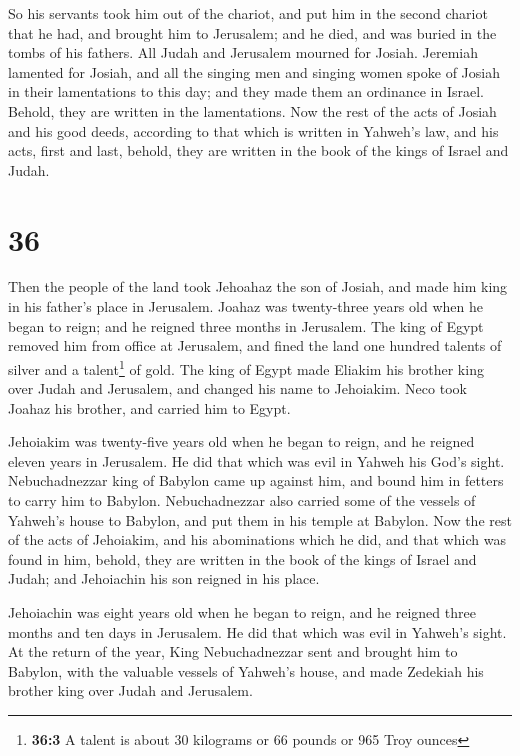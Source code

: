  So his servants took him out of the chariot, and put him
in the second chariot that he had, and brought him to Jerusalem; and he
died, and was buried in the tombs of his fathers. All Judah and
Jerusalem mourned for Josiah.  Jeremiah lamented for
Josiah, and all the singing men and singing women spoke of Josiah in
their lamentations to this day; and they made them an ordinance in
Israel. Behold, they are written in the lamentations. 
Now the rest of the acts of Josiah and his good deeds, according to that
which is written in Yahweh's law,  and his acts, first
and last, behold, they are written in the book of the kings of Israel
and Judah.

\hypertarget{section-35}{%
\section{36}\label{section-35}}

 Then the people of the land took Jehoahaz the son of
Josiah, and made him king in his father's place in Jerusalem.
 Joahaz was twenty-three years old when he began to reign;
and he reigned three months in Jerusalem.  The king of
Egypt removed him from office at Jerusalem, and fined the land one
hundred talents of silver and a talent\footnote{\textbf{36:3} A talent
  is about 30 kilograms or 66 pounds or 965 Troy ounces} of gold.
 The king of Egypt made Eliakim his brother king over
Judah and Jerusalem, and changed his name to Jehoiakim. Neco took Joahaz
his brother, and carried him to Egypt.

 Jehoiakim was twenty-five years old when he began to
reign, and he reigned eleven years in Jerusalem. He did that which was
evil in Yahweh his God's sight.  Nebuchadnezzar king of
Babylon came up against him, and bound him in fetters to carry him to
Babylon.  Nebuchadnezzar also carried some of the vessels
of Yahweh's house to Babylon, and put them in his temple at Babylon.
 Now the rest of the acts of Jehoiakim, and his
abominations which he did, and that which was found in him, behold, they
are written in the book of the kings of Israel and Judah; and Jehoiachin
his son reigned in his place.

 Jehoiachin was eight years old when he began to reign,
and he reigned three months and ten days in Jerusalem. He did that which
was evil in Yahweh's sight.  At the return of the year,
King Nebuchadnezzar sent and brought him to Babylon, with the valuable
vessels of Yahweh's house, and made Zedekiah his brother king over Judah
and Jerusalem.

